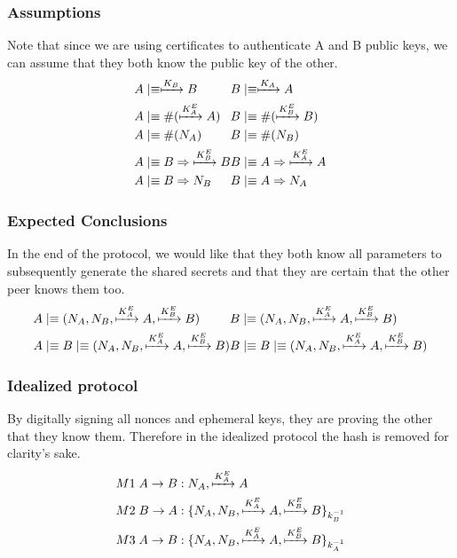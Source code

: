 \subsubsection{Assumptions}
Note that since we are using certificates to authenticate A and B public keys, 
we can assume that they both know the public key of the other.
\begin{align*}
    \begin{split}
        &A \mid\equiv \xmapsto{K_B} B \\
        &A \mid\equiv \#(\xmapsto{K_A^E}A) \\
        &A \mid\equiv \#(N_A) \\
        &A \mid\equiv B \Rightarrow{\xmapsto{K_B^E}B} \\
        &A \mid\equiv B \Rightarrow{N_B}
    \end{split}
    \begin{split}
        &B \mid\equiv \xmapsto{K_A} A \\
        &B \mid\equiv \#(\xmapsto{K_B^E}B) \\
        &B \mid\equiv \#(N_B) \\
        &B \mid\equiv A \Rightarrow{\xmapsto{K_A^E}A} \\
        &B \mid\equiv A \Rightarrow{N_A}
    \end{split}
\end{align*}
\subsubsection{Expected Conclusions}
In the end of the protocol, we would like that they both know all parameters to 
subsequently generate the shared secrets and that they are certain that the 
other peer knows them too.
\begin{align*}
    \begin{split}
        &A \mid\equiv (N_A,N_B,\xmapsto{K_A^E}A,\xmapsto{K_B^E}B) \\
        &A \mid\equiv B \mid\equiv (N_A,N_B,\xmapsto{K_A^E}A,\xmapsto{K_B^E}B)
    \end{split}
    \begin{split}
        &B \mid\equiv (N_A,N_B,\xmapsto{K_A^E}A,\xmapsto{K_B^E}B) \\
        &B \mid\equiv B \mid\equiv (N_A,N_B,\xmapsto{K_A^E}A,\xmapsto{K_B^E}B)
    \end{split}
\end{align*}

\subsubsection{Idealized protocol}
By digitally signing all nonces and ephemeral keys, they are proving the other 
that they know them. Therefore in the idealized protocol the hash is removed 
for clarity's sake.
\begin{align*}
    &M1 \; A \rightarrow B : N_A, \xmapsto{K_A^E}A \\
    &M2 \; B \rightarrow A : \{N_A,N_B,\xmapsto{K_A^E}A,\xmapsto{K_B^E}B\}_{k_B^{-1}} \\
    &M3 \; A \rightarrow B : \{N_A,N_B,\xmapsto{K_A^E}A,\xmapsto{K_B^E}B\}_{k_A^{-1}}
\end{align*}

